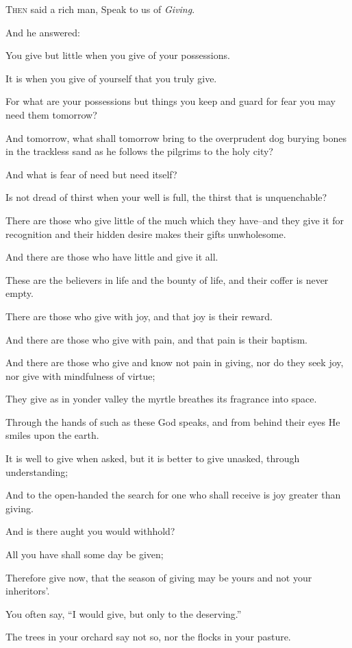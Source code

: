 \lettrine{T}{hen} said a rich man, Speak to us of
\textit{Giving}. 

\bigskip
And he answered:

You give but little when you give of
your possessions.

It is when you give of yourself that you
truly give.

For what are your possessions but things
you keep and guard for fear you may need
them tomorrow?

And tomorrow, what shall tomorrow bring
to the overprudent dog burying bones
in the trackless sand as he follows the
pilgrims to the holy city?

And what is fear of need but need
itself?

Is not dread of thirst when your well is
full, the thirst that is unquenchable?

There are those who give little of the
much which they have--and they give
it for recognition and their hidden
desire makes their gifts unwholesome.

And there are those who have little and
give it all.

These are the believers in life and
the bounty of life, and their coffer is
never empty.

There are those who give with joy, and
that joy is their reward.

And there are those who give with pain,
and that pain is their baptism.

And there are those who give and know
not pain in giving, nor do they seek
joy, nor give with mindfulness of
virtue;

They give as in yonder valley the myrtle
breathes its fragrance into space.

Through the hands of such as these God
speaks, and from behind their eyes He
smiles upon the earth.


It is well to give when asked, but it
is better to give unasked, through
understanding;

And to the open-handed the search for
one who shall receive is joy greater
than giving.

And is there aught you would withhold?

All you have shall some day be given;

Therefore give now, that the season
of giving may be yours and not your
inheritors’.

You often say, “I would give, but only
to the deserving.”

The trees in your orchard say not so,
nor the flocks in your pasture.

